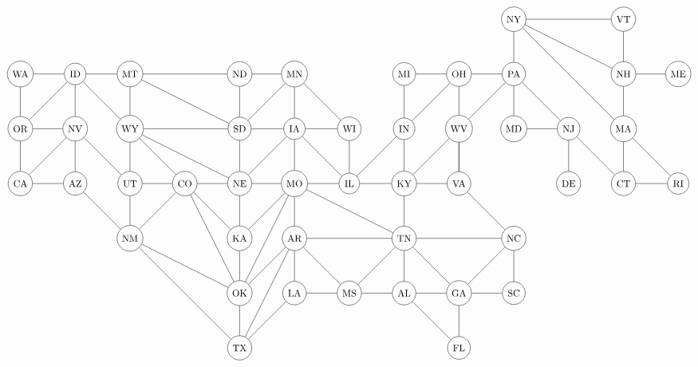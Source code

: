 \documentclass[landscape]{proc}
\theoremstyle{definition}
\theoremstyle{remark}
\numberwithin{equation}{subsection}
\begin{document}
	
	
\[
	\begin{tikzpicture}
	\node[circle,draw] (WA) at (0,10){WA};
	\node[circle,draw] (OR) at (0,8){OR};
	\node[circle,draw] (CA) at (0,6){CA};
	\node[circle,draw] (ID) at (2,10){ID};
	\node[circle,draw] (NV) at (2,8){NV};
	\node[circle,draw] (AZ) at (2,6){AZ};
	\node[circle,draw] (MT) at (4,10){MT};
	\node[circle,draw] (WY) at (4,8){WY};
	\node[circle,draw] (UT) at (4,6){UT};
	\node[circle,draw] (NM) at (4,4){NM};
	\node[circle,draw] (CO) at (6,6){CO};
	\node[circle,draw] (ND) at (8,10){ND};
	\node[circle,draw] (SD) at (8,8){SD};
	\node[circle,draw] (NE) at (8,6){NE};
	\node[circle,draw] (KA) at (8,4){KA};
	\node[circle,draw] (OK) at (8,2) {OK};
	\node[circle,draw] (TX) at (8,0){TX};
	\node[circle,draw] (MN) at (10,10){MN};
	\node[circle,draw] (IA) at (10,8){IA};
	\node[circle,draw] (MO) at (10,6){MO};
	\node[circle,draw] (AR) at (10,4){AR};
	\node[circle,draw] (LA) at (10,2){LA};
	\node[circle,draw] (WI) at (12,8){WI};
	\node[circle,draw] (IL) at (12,6){IL};
	\node[circle,draw] (MS) at (12,2){MS};
	\node[circle,draw] (MI) at (14,10){MI};
	\node[circle,draw] (IN) at (14,8){IN};
	\node[circle,draw] (KY) at (14,6){KY};
	\node[circle,draw] (TN) at (14,4){TN};
	\node[circle,draw] (AL) at (14,2){AL};
	\node[circle,draw] (OH) at (16,10){OH};
	\node[circle,draw] (WV) at (16,8){WV};
	\node[circle,draw] (VA) at (16,6){VA};
	\node[circle,draw] (GA) at (16,2){GA};
	\node[circle,draw] (FL) at (16,0){FL};
	\node[circle,draw] (NY) at (18,12){NY};
	\node[circle,draw] (PA) at (18,10){PA};
	\node[circle,draw] (MD) at (18,8){MD};
	\node[circle,draw] (NC) at (18,4){NC};
	\node[circle,draw] (SC) at (18,2){SC};
	\node[circle,draw] (NJ) at (20,8){NJ};
	\node[circle,draw] (DE) at (20,6){DE};
	\node[circle,draw] (VT) at (22,12){VT};
	\node[circle,draw] (NH) at (22,10){NH};
	\node[circle,draw] (MA) at (22,8){MA};
	\node[circle,draw] (CT) at (22,6){CT};
	\node[circle,draw] (RI) at (24,6){RI};
	\node[circle,draw] (ME) at (24,10){ME};

	
\foreach \from/\to in {CA/OR,OR/WA,WA/ID,ID/OR,ID/NV,OR/NV,NV/AZ,CA/AZ,CA/NV,ID/MT,MT/ND,MT/SD,ID/WY,MT/WY,WY/UT,WY/CO,WY/NE,WY/SD,NV/UT,NM/AZ,NM/UT,TX/OK,NM/CO,NM/TX,NM/OK,CO/NE,CO/KA,CO/OK,CO/UT,ND/SD,SD/NE,NE/KA,KA/OK,MN/ND,MN/SD,MN/IA,IA/SD,IA/NE,IA/MO,MO/NE,MO/KA,MO/OK,MO/AR,MO/TN,AR/OK,AR/TX,AR/LA,LA/TX,MN/WI,IA/WI,WI/IL,IL/IA,IL/MO,IL/KY,MS/AR,MS/LA,MI/IN,MI/OH,IN/IL,IN/KY,KY/TN,TN/MS,TN/AR,TN/AL,AL/MS,AL/FL,OH/IN,OH/WV,WV/VA,WV/KY,WV/VA,VA/KY,VA/NC,NC/GA,NC/TN,NC/SC,SC/GA,GA/AL,GA/TN,GA/FL,PA/OH,PA/WV,PA/NJ,PA/MD,MD/NJ,NJ/DE,NJ/CT,CT/RI,NY/PA,NY/VT,NY/NH,NY/MA,VT/NH,NH/MA,MA/CT,MA/RI,NH/ME}
\draw (\from) -- (\to);
\end{tikzpicture}
\]
	
	
\end{document}
